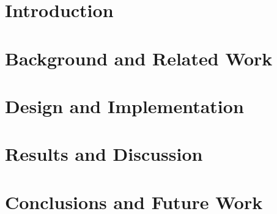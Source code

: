 \section{Introduction}
\label{sec:introduction}


\section{Background and Related Work}
\label{sec:background}


\section{Design and Implementation}
\label{sec:design-implementation}


\section{Results and Discussion}
\label{sec:results-discussions}


\section{Conclusions and Future Work}
\label{sec:conclusions-future}


\printbibliography[title={References},heading=bibintoc] %

\begin{uomappendix} 
    \label{sec:appendix}
    
\end{uomappendix}


